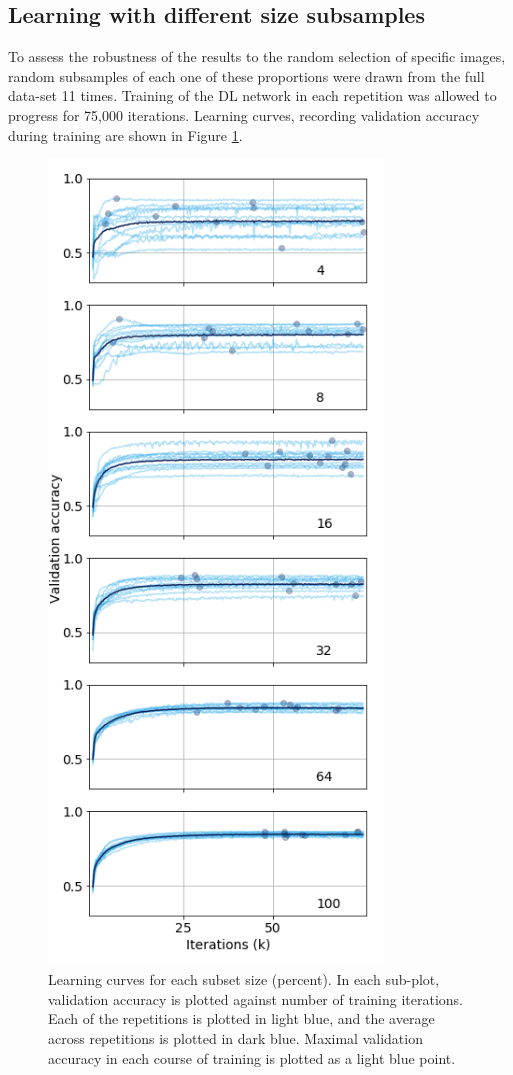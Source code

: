 \subsection{Learning with different size subsamples}

To assess the robustness of the results to the random selection of specific
images, random subsamples of each one of these proportions were drawn from the
full data-set 11 times. Training of the DL network in each repetition was
allowed to progress for 75,000 iterations. Learning curves, recording validation
accuracy during training are shown in Figure \ref{fig_learning_curves}.

\begin{figure}[!t]
\centering
\includegraphics[width=3.5in]{./figures/learning}

\caption{Learning curves for each subset size (percent). In each sub-plot,
validation accuracy is plotted against number of training iterations. Each of
the repetitions is plotted in light blue, and the average across repetitions is
plotted in dark blue. Maximal validation accuracy in each course of training is
plotted as a light blue point.}

\label{fig_learning_curves}
\end{figure}

